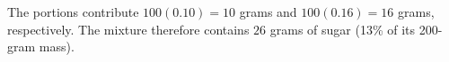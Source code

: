 The portions contribute $ 100(0.10)=10 $ grams and $ 100(0.16)=16 $ grams, respectively. The mixture therefore contains $\boxed{26}$ grams of sugar (13\% of its 200-gram mass).

